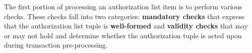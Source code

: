 The first portion of processing an authorization list item is to perform various checks.
These checks fall into two categories:
\textbf{mandatory checks} that express that the
authorization list tuple is \textbf{well-formed} and
\textbf{validity checks} that may or may not hold and determine whether the authorization tuple
is acted upon during transaction pre-processing.
